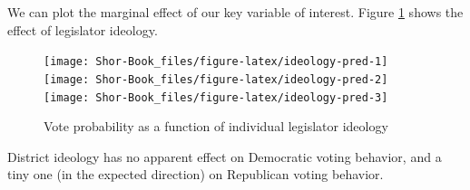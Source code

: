 \documentclass[
  oneside]{book}
\begin{document}
We can plot the marginal effect of our key variable of interest. Figure \ref{fig:ideology-pred} shows the effect of legislator ideology.

\begin{figure}
\texttt{[image: Shor-Book\_files/figure-latex/ideology-pred-1]} \texttt{[image: Shor-Book\_files/figure-latex/ideology-pred-2]} \texttt{[image: Shor-Book\_files/figure-latex/ideology-pred-3]} \caption{Vote probability as a function of individual legislator ideology}\label{fig:ideology-pred}
\end{figure}

District ideology has no apparent effect on Democratic voting behavior, and a tiny one (in the expected direction) on Republican voting behavior.

  
\end{document}
